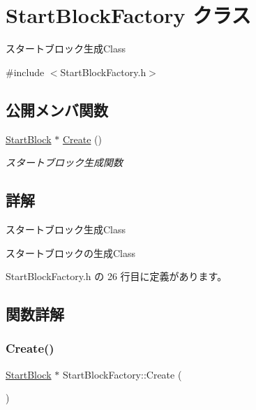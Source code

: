 \hypertarget{class_start_block_factory}{}\section{Start\+Block\+Factory クラス}
\label{class_start_block_factory}


スタートブロック生成\+Class  




{\ttfamily \#include $<$Start\+Block\+Factory.\+h$>$}

\subsection*{公開メンバ関数}
\begin{DoxyCompactItemize}
\item 
\mbox{\hyperlink{class_start_block}{Start\+Block}} $\ast$ \mbox{\hyperlink{class_start_block_factory_a90b69165e15ac0c16bb183e9e49a2f39}{Create}} ()
\begin{DoxyCompactList}\small\item\em スタートブロック生成関数 \end{DoxyCompactList}\end{DoxyCompactItemize}


\subsection{詳解}
スタートブロック生成\+Class 

スタートブロックの生成\+Class 

 Start\+Block\+Factory.\+h の 26 行目に定義があります。



\subsection{関数詳解}
\mbox{\label{class_start_block_factory_a90b69165e15ac0c16bb183e9e49a2f39}} 
\subsubsection{\texorpdfstring{Create()}{Create()}}
{\footnotesize\ttfamily \mbox{\hyperlink{class_start_block}{Start\+Block}} $\ast$ Start\+Block\+Factory\+::\+Create (\begin{DoxyParamCaption}{ }\end{DoxyParamCaption})}



